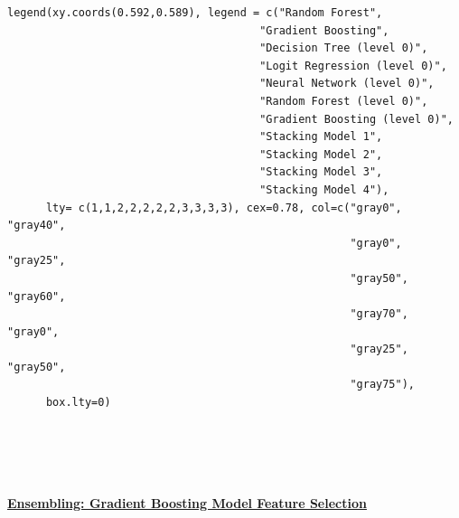 \documentclass[12pt]{article}
\begin{document}
\begin{lstlisting}
legend(xy.coords(0.592,0.589), legend = c("Random Forest", 
                                       "Gradient Boosting", 
                                       "Decision Tree (level 0)",
                                       "Logit Regression (level 0)", 
                                       "Neural Network (level 0)", 
                                       "Random Forest (level 0)",
                                       "Gradient Boosting (level 0)",
                                       "Stacking Model 1",
                                       "Stacking Model 2", 
                                       "Stacking Model 3", 
                                       "Stacking Model 4"), 
      lty= c(1,1,2,2,2,2,2,3,3,3,3), cex=0.78, col=c("gray0", "gray40", 
                                                     "gray0", "gray25", 
                                                     "gray50", "gray60", 
                                                     "gray70", "gray0", 
                                                     "gray25", "gray50", 
                                                     "gray75"),
      box.lty=0)
       
       
       
       
\end{lstlisting}

\begin{algorithm}
\caption[Ensembling: Gradient Boosting Model Feature Selection]{\href{https://github.com/schreckf/NIC_Schreck/blob/master/code}{\color{Black}\large\textbf{Ensembling: Gradient Boosting Model Feature Selection}}}
\end{algorithm}
\end{document}
